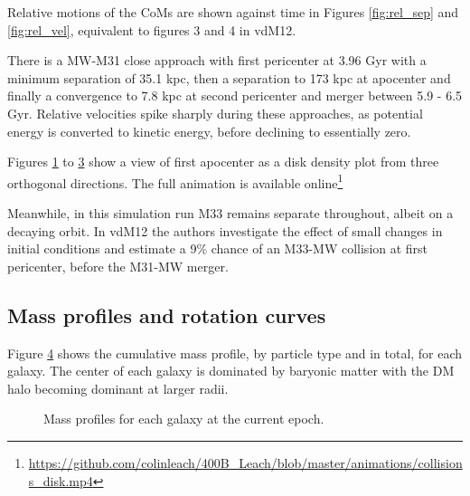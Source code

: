 \documentclass[twocolumn]{aastex63}
\begin{document}
Relative motions of the CoMs are shown against time in Figures \ref{fig:rel_sep} and \ref{fig:rel_vel}, equivalent to figures 3 and 4 in vdM12.


There is a MW-M31 close approach with first pericenter at 3.96 Gyr with a minimum separation of 35.1 kpc, then a separation to 173 kpc at apocenter and finally a convergence to 7.8 kpc at second pericenter and merger between 5.9 - 6.5 Gyr. Relative velocities spike sharply during these approaches, as potential energy is converted to kinetic energy, before declining to essentially zero.

\begin{figure}[hbt!]
	\caption{\label{fig:3view_first_apo_a}}
\end{figure}\vspace{-5mm}

\begin{figure}[hbt!]
	\caption{\label{fig:3view_first_apo_b}}
\end{figure}\vspace{-5mm}

\begin{figure}[hbt!]
	\caption{\label{fig:3view_first_apo_c}}
\end{figure}

Figures \ref{fig:3view_first_apo_a} to \ref{fig:3view_first_apo_c} show a view of first apocenter as a disk density plot from three orthogonal directions. The full animation is available online\footnote{\url{https://github.com/colinleach/400B_Leach/blob/master/animations/collisions_disk.mp4}}


Meanwhile, in this simulation run M33 remains separate throughout, albeit on a decaying orbit. In vdM12 the authors investigate the effect of small changes in initial conditions and estimate a 9\% chance of an M33-MW collision at first pericenter, before the M31-MW merger.

\subsection{Mass profiles and rotation curves}

Figure \ref{fig:massprof0} shows the cumulative mass profile, by particle type and in total, for each galaxy. The center of each galaxy is dominated by baryonic matter with the DM halo becoming dominant at larger radii.
\begin{figure}[bht!]
	\caption{Mass profiles for each galaxy at the current epoch.
		\label{fig:massprof0}}
\end{figure}
\end{document}

